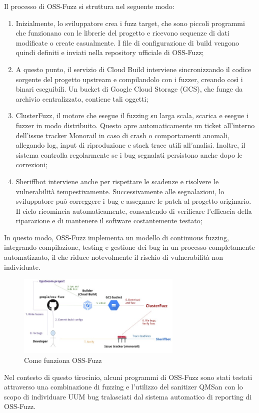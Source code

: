 Il processo di OSS-Fuzz si struttura nel seguente modo:
\begin{enumerate}
  \item Inizialmente, lo sviluppatore crea i fuzz target, che sono piccoli programmi che funzionano con le librerie del progetto e ricevono sequenze di dati modificate o create casualmente. I file di configurazione di build vengono quindi definiti e inviati nella repository ufficiale di OSS-Fuzz;
  \item A questo punto, il servizio di Cloud Build interviene sincronizzando il codice sorgente del progetto upstream e compilandolo con i fuzzer, creando così i binari eseguibili. Un bucket di Google Cloud Storage (GCS), che funge da archivio centralizzato, contiene tali oggetti;
  \item ClusterFuzz, il motore che esegue il fuzzing su larga scala, scarica e esegue i fuzzer in modo distribuito. Questo apre automaticamente un ticket all'interno dell'issue tracker Monorail in caso di crash o comportamenti anomali, allegando log, input di riproduzione e stack trace utili all'analisi. Inoltre, il sistema controlla regolarmente se i bug segnalati persistono anche dopo le correzioni;
  \item Sheriffbot interviene anche per rispettare le scadenze e risolvere le vulnerabilità tempestivamente. Successivamente alle segnalazioni, lo sviluppatore può correggere i bug e assegnare le patch al progetto originario. Il ciclo ricomincia automaticamente, consentendo di verificare l'efficacia della riparazione e di mantenere il software costantemente testato;
\end{enumerate}

In questo modo, OSS-Fuzz implementa un modello di continuous fuzzing, integrando compilazione, testing e gestione dei bug in un processo completamente automatizzato, il che riduce notevolmente il rischio di vulnerabilità non individuate.

\begin{figure}[htbp]        
  \centering               
  \includegraphics[width=0.7\textwidth]{immagini/oss-fuzz.jpg}  
  \caption{Come funziona OSS-Fuzz}  
  \label{fig:oss-fuzz}      
\end{figure}

Nel contesto di questo tirocinio, alcuni programmi di OSS-Fuzz sono stati testati attraverso una combinazione di fuzzing e l’utilizzo del sanitizer QMSan con lo scopo di individuare UUM bug tralasciati dal sistema automatico di reporting di OSS-Fuzz.
